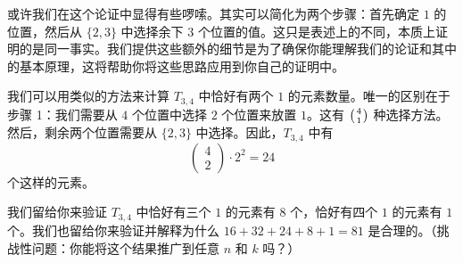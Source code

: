 \begin{example}
    或许我们在这个论证中显得有些啰嗦。其实可以简化为两个步骤：首先确定 $1$ 的位置，然后从 $\{2, 3\}$ 中选择余下 $3$ 个位置的值。这只是表述上的不同，本质上证明的是同一事实。我们提供这些额外的细节是为了确保你能理解我们的论证和其中的基本原理，这将帮助你将这些思路应用到你自己的证明中。

    我们可以用类似的方法来计算 $T_{3,4}$ 中恰好有两个 $1$ 的元素数量。唯一的区别在于步骤 1：我们需要从 $4$ 个位置中选择 $2$ 个位置来放置 $1$。这有 $\big({4 \atop 1}\big)$ 种选择方法。然后，剩余两个位置需要从 $\{2, 3\}$ 中选择。因此，$T_{3,4}$ 中有
    \[\begin{pmatrix}
            4 \\
            2
        \end{pmatrix} \cdot 2^2 = 24\]
    个这样的元素。

    我们留给你来验证 $T_{3,4}$ 中恰好有三个 $1$ 的元素有 $8$ 个，恰好有四个 $1$ 的元素有 $1$ 个。我们也留给你来验证并解释为什么 $16 + 32 + 24 + 8 + 1 = 81$ 是合理的。（挑战性问题：你能将这个结果推广到任意 $n$ 和 $k$ 吗？）
\end{example}

